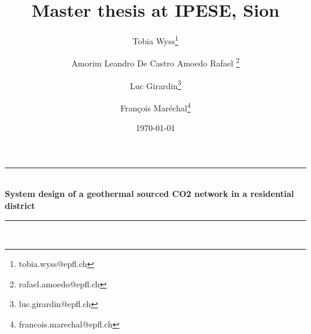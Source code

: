
\begin{titlepage}

\newcommand{\HRule}{\rule{\linewidth}{0.5mm}} %
\begin{center}{
\HRule \\[0.4cm] 
\huge \bfseries{System design of a geothermal sourced CO2 network in a residential district}
\HRule \\[0.5cm]}
\end{center}

\title{Master thesis at IPESE, Sion}

\author[2]{Tobia Wyss\thanks{tobia.wyss@epfl.ch}}

\author[1]{Amorim Leandro De Castro Amoedo Rafael \thanks{rafael.amoedo@epfl.ch}}
\author[1]{Luc Girardin\thanks{luc.girardin@epfl.ch}}
\author[1]{Fran\c{c}ois Mar\'echal\thanks{francois.marechal@epfl.ch}}




%

\date{\today} %
{\let\newpage\relax\maketitle}
\vspace*{\fill}

\begin{figure*}[!htb]
\centering
{}\hfill
\quad
{}
\end{figure*}

\thispagestyle{postprintnote}

\end{titlepage}




